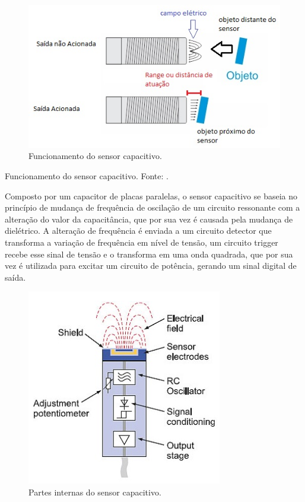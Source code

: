 \begin{figure}[!ht]
	\centering
		\includegraphics[scale=0.7]{figuras/eletronica/8-Funcionamento-sensor-capacitivo.jpg}
	\caption{Funcionamento do sensor capacitivo.}
\end{figure}

Funcionamento do sensor capacitivo. Fonte: \cite{sensorCapacitivoImagem}.

Composto por um capacitor de placas paralelas, o sensor capacitivo se baseia no princípio de mudança de frequência de oscilação de um circuito ressonante com a alteração do valor da capacitância, que por sua vez é causada pela mudança de dielétrico. A alteração de frequência é enviada a um circuito detector que transforma a variação de frequência em nível de tensão, um circuito trigger recebe esse sinal de tensão e o transforma em uma onda quadrada, que por sua vez é utilizada para excitar um circuito de potência, gerando um sinal digital de saída. \cite{sensorCapacitivo}

\begin{figure}[!ht]
	\centering
		\includegraphics[scale=0.7]{figuras/eletronica/9-Partes-internas-sensor-capacitivo.jpg}
	\caption{Partes internas do sensor capacitivo.}
\end{figure}

